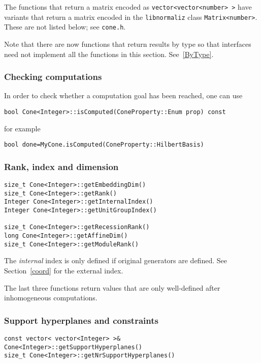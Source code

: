 \begin{small}
The functions that return a matrix encoded as \verb|vector<vector<number> >| have variants that return a matrix encoded in the \verb|libnormaliz| class \verb|Matrix<number>|. These are not listed below; see \verb|cone.h|.

Note that there are now functions that return results by type so that interfaces need not implement all the functions in this section. See~\ref{ByType}.

\subsubsection{Checking computations}
In order to check whether a computation goal has been reached, one can use
\begin{Verbatim}
bool Cone<Integer>::isComputed(ConeProperty::Enum prop) const 
\end{Verbatim}
for example
\begin{Verbatim}
bool done=MyCone.isComputed(ConeProperty::HilbertBasis)
\end{Verbatim}

\subsubsection{Rank, index and dimension}

\begin{Verbatim}
size_t Cone<Integer>::getEmbeddingDim()
size_t Cone<Integer>::getRank()
Integer Cone<Integer>::getInternalIndex()
Integer Cone<Integer>::getUnitGroupIndex()

size_t Cone<Integer>::getRecessionRank()
long Cone<Integer>::getAffineDim()
size_t Cone<Integer>::getModuleRank()
\end{Verbatim}

The \emph{internal} index is only defined if original generators are defined. See Section~\ref{coord} for the external index.

The last three functions return values that are only well-defined after inhomogeneous computations.

\subsubsection{Support hyperplanes and constraints}\label{SHC}

\begin{Verbatim}
const vector< vector<Integer> >& Cone<Integer>::getSupportHyperplanes()
size_t Cone<Integer>::getNrSupportHyperplanes()
\end{Verbatim}


\end{small}
